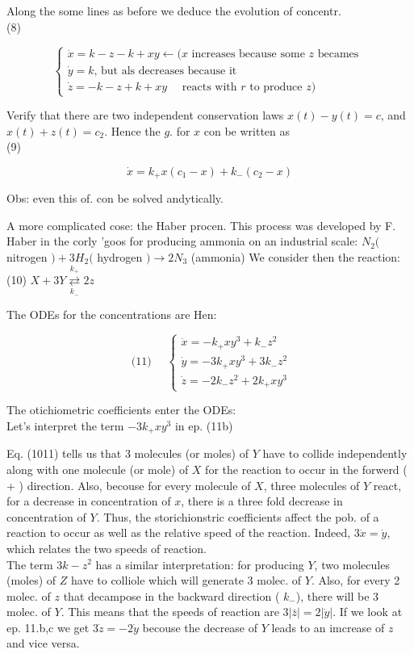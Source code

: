 \documentclass[10pt]{article}
\begin{document}
Along the some lines as before we deduce the evolution of concentr.\\
(8)

$$
\left\{\begin{array}{l}
\dot{x}=k-z-k+x y \leftarrow(x \text { increases because some } z \text { becames } \\
\dot{y}=k \text {, but als decreases because it } \\
\dot{z}=-k-z+k+x y \quad \text { reacts with } r \text { to produce } z)
\end{array}\right.
$$

Verify that there are two independent conservation laws $x(t)-y(t)=c$, and $x(t)+z(t)=c_{2}$. Hence the $g$. for $x$ con be written as\\
(9)

$$
\dot{x}=k_{+} x\left(c_{1}-x\right)+k_{-}\left(c_{2}-x\right)
$$

Obs: even this of. con be solved andytically.

A more complicated cose: the Haber procen. This process was developed by F. Haber in the corly 'goos for producing ammonia on an industrial scale: $N_{2}($ nitrogen $)+3 H_{2}($ hydrogen $) \longrightarrow 2 N_{3}$ (ammonia) We consider then the reaction:\\
(10) $X+3 Y \underset{k_{-}}{\stackrel{k_{+}}{\rightleftarrows}} 2 z$

The ODEs for the concentrations are Hen:

\[
\text { (11) } \quad\left\{\begin{array}{l}
\dot{x}=-k_{+} x y^{3}+k_{-} z^{2}  \tag{a)}\\
\dot{y}=-3 k_{+} x y^{3}+3 k_{-} z^{2} \\
\dot{z}=-2 k_{-} z^{2}+2 k_{+} x y^{3}
\end{array}\right.
\]

The otichiometric coefficients enter the ODEs:\\
Let's interpret the term $-3 k_{+} x y^{3}$ in ep. (11b)

Eq. (1011) tells us that 3 molecules (or moles) of $Y$ have to collide independently along with one molecule (or mole) of $X$ for the reaction to occur in the forwerd ( + ) direction. Also, becouse for every molecule of $X$, three molecules of $Y$ react, for a decrease in concentration of $x$, there is a three fold decrease in concentration of $Y$. Thus, the storichionstric coefficients affect the pob. of a reaction to occur as well as the relative speed of the reaction. Indeed, $3 \dot{x}=\dot{y}$, which relates the two speeds of reaction.\\
The term $3 k-z^{2}$ has a similar interpretation: for producing $Y$, two molecules (moles) of $Z$ have to colliole which will generate 3 molec. of $Y$. Also, for every 2 molec. of $z$ that decampose in the backward direction ( $k_{-}$), there will be 3 molec. of $Y$. This means that the speeds of reaction are $3|\bar{z}|=2|\dot{y}|$. If we look at ep. 11.b,c we get $3 \dot{z}=-2 \dot{y}$ becouse the decrease of $Y$ leads to an imcrease of $z$ and vice versa.
\end{document}
